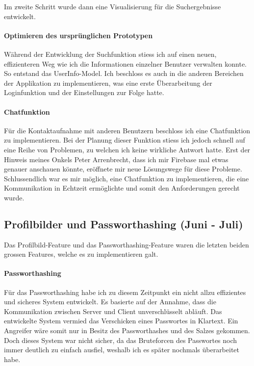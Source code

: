 \documentclass[../main.tex]{subfiles}
\begin{document}
	Im zweite Schritt wurde dann eine Visualisierung für die Suchergebnisse entwickelt.
	
	\paragraph{Optimieren des ursprünglichen Prototypen}
	Während der Entwicklung der Suchfunktion stiess ich auf einen neuen, effizienteren Weg wie ich die Informationen einzelner Benutzer verwalten konnte. So entstand das UserInfo-Model. Ich beschloss es auch in die anderen Bereichen der Applikation zu implementieren, was eine erste Überarbeitung der Loginfunktion und der Einstellungen zur Folge hatte.
	
	\paragraph{Chatfunktion}
	Für die Kontaktaufnahme mit anderen Benutzern beschloss ich eine Chatfunktion zu implementieren. Bei der Planung dieser Funktion stiess ich jedoch schnell auf eine Reihe von Problemen, zu welchen ich keine wirkliche Antwort hatte. Erst der Hinweis meines Onkels Peter Arrenbrecht, dass ich mir Firebase mal etwas genauer anschauen könnte, eröffnete mir neue Lösungswege für diese Probleme. Schlussendlich war es mir möglich, eine Chatfunktion zu implementieren, die eine Kommunikation in Echtzeit ermöglichte und somit den Anforderungen gerecht wurde.
	
	\subsection{Profilbilder und Passworthashing (Juni - Juli)}
	Das Profilbild-Feature und das Passworthashing-Feature waren die letzten beiden grossen Features, welche es zu implementieren galt.
	\paragraph{Passworthashing}
	Für das Passworthashing habe ich zu diesem Zeitpunkt ein nicht allzu effizientes und sicheres System entwickelt. Es basierte auf der Annahme, dass die Kommunikation zwischen Server und Client unverschlüsselt abläuft. Das entwickelte System vermied das Verschicken eines Passwortes in Klartext. Ein Angreifer wäre somit nur in Besitz des Passworthashes und des Salzes gekommen. Doch dieses System war nicht sicher, da das Bruteforcen des Passwortes noch immer deutlich zu einfach ausfiel, weshalb ich es später nochmals überarbeitet habe.
	
\end{document}
